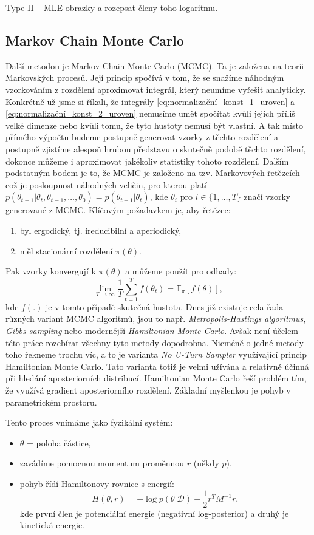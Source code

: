 Type II – MLE obrazky a rozepsat členy toho logaritmu.


\subsection{Markov Chain Monte Carlo}
Další metodou je Markov Chain Monte Carlo (MCMC).
Ta je založena na teorii Markovských procesů.
Její princip spočívá v tom, že se snažíme náhodným vzorkováním z rozdělení aproximovat integrál, který neumíme vyřešit analyticky.
Konkrétně už jsme si říkali, že integrály \ref{eq:normalizační_konst_1_uroven} a \ref{eq:normalizační_konst_2_uroven} nemusíme umět spočítat kvůli jejich příliš velké dimenze nebo kvůli tomu, že tyto hustoty nemusí být vlastní.
A tak místo přímého výpočtu budeme postupně generovat vzorky z těchto rozdělení a postupně zjistíme alespoň hrubou představu o skutečně podobě těchto rozdělení, dokonce můžeme i aproximovat jakékoliv statistiky tohoto rozdělení.
Dalším podstatným bodem je to, že MCMC je založeno na tzv. Markovových řetězcích což je posloupnost náhodných veličin, pro kterou platí $p(\theta_{t+1}|\theta_t, \theta_{t-1}, \dots , \theta_0) = p(\theta_{t+1}|\theta_t)$, kde $\theta_i$ pro $i \in \{1, \dots, T\}$ značí vzorky generované z MCMC.
Klíčovým požadavkem je, aby řetězec:
\begin{enumerate}
  \item byl ergodický, tj. ireducibilní a aperiodický,
  \item měl stacionární rozdělení $\pi(\theta)$.
\end{enumerate}
Pak vzorky konvergují k $\pi(\theta)$ a můžeme použít pro odhady: 
\[
\lim_{T \to \infty} \frac{1}{T} \sum_{t=1}^{T} f(\theta_t) = \mathbb{E}_{\pi}[f(\theta)],
\]
kde $f(.)$ je v tomto případě skutečná hustota.
Dnes již existuje cela řada různých variant MCMC algoritmů, jsou to např. \textit{Metropolis-Hastings algoritmus}, \textit{Gibbs sampling} nebo modernější \textit{Hamiltonian Monte Carlo}.
Avšak není účelem této práce rozebírat všechny tyto metody dopodrobna. 
Nicméně o jedné metody toho řekneme trochu víc, a to je varianta \textit{No U-Turn Sampler} využívající princip Hamiltonian Monte Carlo.
Tato varianta totiž je velmi užívána a relativně účinná při hledání aposteriorních distribucí. 
Hamiltonian Monte Carlo řeší problém tím, že využívá gradient aposteriorního rozdělení.
Základní myšlenkou je pohyb v parametrickém prostoru.
\par

Tento proces vnímáme jako fyzikální systém:
\begin{itemize}
    \item $\theta$ = poloha částice,
    \item zavádíme pomocnou momentum proměnnou $r$ (někdy $p$),
    \item pohyb řídí Hamiltonovy rovnice s energií:
    \[ 
    H(\theta, r) = -\log p(\theta | \mathcal{D}) + \frac{1}{2}r^T M^{-1} r,
    \]
    kde první člen je potenciální energie (negativní log-posterior) a druhý je kinetická energie.
\end{itemize}


